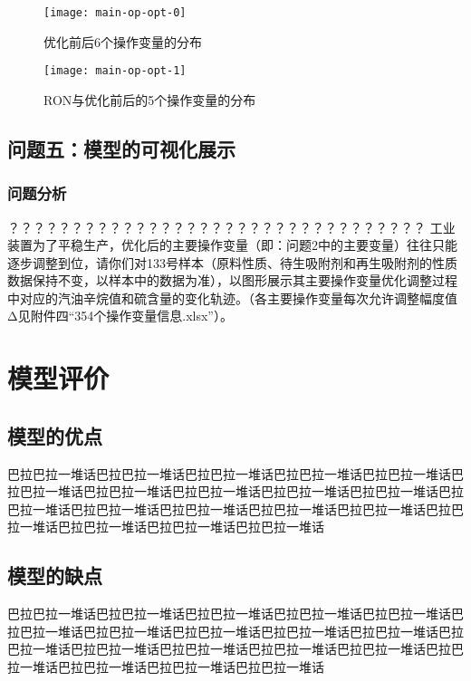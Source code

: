 \documentclass[bwprint]{gmcmthesis}
\begin{document}
\begin{figure}[htb]
	\centering
	\texttt{[image: main-op-opt-0]}
	\caption{优化前后6个操作变量的分布}
\end{figure}

\begin{figure}[htb]
	\centering
	\texttt{[image: main-op-opt-1]}
	\caption{RON与优化前后的5个操作变量的分布}
\end{figure}

\FloatBarrier
\subsection{问题五：模型的可视化展示}

\FloatBarrier
\subsubsection{问题分析}

？？？？？？？？？？？？？？？？？？？？？？？？？？？？？？？？？
工业装置为了平稳生产，优化后的主要操作变量（即：问题2中的主要变量）往往只能逐步调整到位，请你们对133号样本（原料性质、待生吸附剂和再生吸附剂的性质数据保持不变，以样本中的数据为准），以图形展示其主要操作变量优化调整过程中对应的汽油辛烷值和硫含量的变化轨迹。（各主要操作变量每次允许调整幅度值Δ见附件四“354个操作变量信息.xlsx”）。



\FloatBarrier
\section{模型评价}


\FloatBarrier
\subsection{模型的优点}
巴拉巴拉一堆话巴拉巴拉一堆话巴拉巴拉一堆话巴拉巴拉一堆话巴拉巴拉一堆话巴拉巴拉一堆话巴拉巴拉一堆话巴拉巴拉一堆话巴拉巴拉一堆话巴拉巴拉一堆话巴拉巴拉一堆话巴拉巴拉一堆话巴拉巴拉一堆话巴拉巴拉一堆话巴拉巴拉一堆话巴拉巴拉一堆话巴拉巴拉一堆话巴拉巴拉一堆话巴拉巴拉一堆话


\FloatBarrier
\subsection{模型的缺点}
巴拉巴拉一堆话巴拉巴拉一堆话巴拉巴拉一堆话巴拉巴拉一堆话巴拉巴拉一堆话巴拉巴拉一堆话巴拉巴拉一堆话巴拉巴拉一堆话巴拉巴拉一堆话巴拉巴拉一堆话巴拉巴拉一堆话巴拉巴拉一堆话巴拉巴拉一堆话巴拉巴拉一堆话巴拉巴拉一堆话巴拉巴拉一堆话巴拉巴拉一堆话巴拉巴拉一堆话巴拉巴拉一堆话
\end{document}
